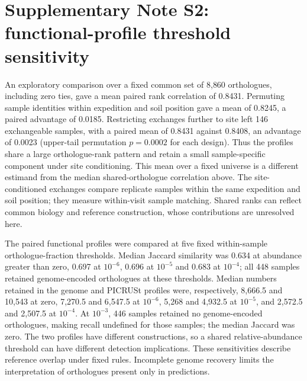 \documentclass[11pt]{article}
\begin{document}
\section*{Supplementary Note S2: functional-profile threshold sensitivity}

An exploratory comparison over a fixed common set of 8{,}860 orthologues, including zero ties, gave a mean paired rank correlation of 0.8431. Permuting sample identities within expedition and soil position gave a mean of 0.8245, a paired advantage of 0.0185. Restricting exchanges further to site left 146 exchangeable samples, with a paired mean of 0.8431 against 0.8408, an advantage of 0.0023 (upper-tail permutation $p = 0.0002$ for each design). Thus the profiles share a large orthologue-rank pattern and retain a small sample-specific component under site conditioning. This mean over a fixed universe is a different estimand from the median shared-orthologue correlation above. The site-conditioned exchanges compare replicate samples within the same expedition and soil position; they measure within-visit sample matching. Shared ranks can reflect common biology and reference construction, whose contributions are unresolved here.

The paired functional profiles were compared at five fixed within-sample orthologue-fraction thresholds. Median Jaccard similarity was 0.634 at abundance greater than zero, 0.697 at $10^{-6}$, 0.696 at $10^{-5}$ and 0.683 at $10^{-4}$; all 448 samples retained genome-encoded orthologues at these thresholds. Median numbers retained in the genome and PICRUSt profiles were, respectively, 8{,}666.5 and 10{,}543 at zero, 7{,}270.5 and 6{,}547.5 at $10^{-6}$, 5{,}268 and 4{,}932.5 at $10^{-5}$, and 2{,}572.5 and 2{,}507.5 at $10^{-4}$. At $10^{-3}$, 446 samples retained no genome-encoded orthologues, making recall undefined for those samples; the median Jaccard was zero. The two profiles have different constructions, so a shared relative-abundance threshold can have different detection implications. These sensitivities describe reference overlap under fixed rules. Incomplete genome recovery limits the interpretation of orthologues present only in predictions.
\end{document}
